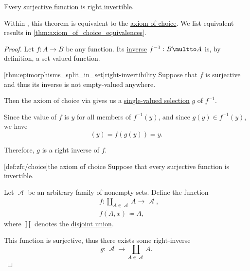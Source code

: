 \begin{theorem}\label{thm:surjective_functions_are_right_invertible}
  Every \hyperref[def:function_invertibility/surjective]{surjective function} is \hyperref[def:morphism_invertibility/right]{right invertible}.
\end{theorem}
\begin{comments}
  \item Within \hyperref[def:zfc]{}, this theorem is equivalent to the \hyperref[def:zfc/choice]{axiom of choice}. We list equivalent results in \cref{thm:axiom_of_choice_equivalences}.
\end{comments}
\begin{proof}
  Let \( f: A \to B \) be any function. Its \hyperref[def:set_valued_function/inverse]{inverse} \( f^{-1}: B \multto A \) is, by definition, a set-valued function.

  [thm:epimorphisms_split_in_set]{right-invertibility} Suppose that \( f \) is surjective and thus its inverse is not empty-valued anywhere.

  Then the axiom of choice via  gives us a \hyperref[def:set_valued_selection]{single-valued selection} \( g \) of \( f^{-1} \).

  Since the value of \( f \) is \( y \) for all members of \( f^{-1}(y) \), and since \( g(y) \in f^{-1}(y) \), we have
  \begin{equation*}
    [f \bincirc g](y) = f(g(y)) = y.
  \end{equation*}

  Therefore, \( g \) is a right inverse of \( f \).

  [def:zfc/choice]{the axiom of choice} Suppose that every surjective function is invertible.

  Let \( \mscrA \) be an arbitrary family of nonempty sets. Define the function
  \begin{equation*}
    \begin{aligned}
      &f: \coprod_{A \in \mscrA} A \to \mscrA, \\
      &f(A, x) \coloneqq A,
    \end{aligned}
  \end{equation*}
  where \( \coprod \) denotes the \hyperref[def:disjoint_union]{disjoint union}.

  This function is surjective, thus there exists some right-inverse
  \begin{equation*}
    g: \mscrA \to \coprod_{A \in \mscrA} A.
  \end{equation*}


\end{proof}

